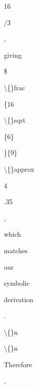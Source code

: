 \begin{figure}[p]
\begin{tcolorbox}
\colorbox{green!79}{\strut\scriptsize 16}\allowbreak\hspace{0pt}%
\colorbox{green!79}{\strut\scriptsize /3}\allowbreak\hspace{0pt}%
\colorbox{green!79}{\strut\scriptsize ,}\allowbreak\hspace{0pt}%
\colorbox{green!79}{\strut\scriptsize  giving}\allowbreak\hspace{0pt}%
\colorbox{green!79}{\strut\scriptsize  \$}\allowbreak\hspace{0pt}%
\colorbox{green!79}{\strut\scriptsize \textbackslash\{\}frac}\allowbreak\hspace{0pt}%
\colorbox{green!79}{\strut\scriptsize \{16}\allowbreak\hspace{0pt}%
\colorbox{green!79}{\strut\scriptsize \textbackslash\{\}sqrt}\allowbreak\hspace{0pt}%
\colorbox{green!79}{\strut\scriptsize \{6\}}\allowbreak\hspace{0pt}%
\colorbox{green!79}{\strut\scriptsize \}\{9\}}\allowbreak\hspace{0pt}%
\colorbox{green!79}{\strut\scriptsize  \textbackslash\{\}approx}\allowbreak\hspace{0pt}%
\colorbox{green!79}{\strut\scriptsize  4}\allowbreak\hspace{0pt}%
\colorbox{green!79}{\strut\scriptsize .35}\allowbreak\hspace{0pt}%
\colorbox{green!79}{\strut\scriptsize ,}\allowbreak\hspace{0pt}%
\colorbox{green!79}{\strut\scriptsize  which}\allowbreak\hspace{0pt}%
\colorbox{green!79}{\strut\scriptsize  matches}\allowbreak\hspace{0pt}%
\colorbox{green!79}{\strut\scriptsize  our}\allowbreak\hspace{0pt}%
\colorbox{green!78}{\strut\scriptsize  symbolic}\allowbreak\hspace{0pt}%
\colorbox{green!79}{\strut\scriptsize  derivation}\allowbreak\hspace{0pt}%
\colorbox{green!79}{\strut\scriptsize .}\allowbreak\hspace{0pt}%
\colorbox{green!79}{\strut\scriptsize \textbackslash\{\}n}\allowbreak\hspace{0pt}%
\colorbox{green!79}{\strut\scriptsize \textbackslash\{\}n}\allowbreak\hspace{0pt}%
\colorbox{green!79}{\strut\scriptsize Therefore}\allowbreak\hspace{0pt}%
\colorbox{green!79}{\strut\scriptsize ,}\allowbreak\hspace{0pt}%

\end{tcolorbox}
\end{figure}
